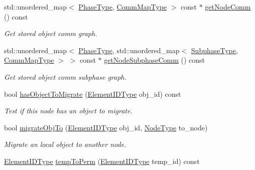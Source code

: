 \begin{DoxyCompactItemize}
std\+::unordered\+\_\+map$<$ \hyperlink{namespacevt_a46ce6733d5cdbd735d561b7b4029f6d7}{Phase\+Type}, \hyperlink{namespacevt_1_1vrt_1_1collection_1_1balance_a10860c956804d644db54a16012352728}{Comm\+Map\+Type} $>$ const  $\ast$ \hyperlink{structvt_1_1vrt_1_1collection_1_1balance_1_1_node_stats_a236c9f6b9ba7446a35cbc1052949d558}{get\+Node\+Comm} () const
\begin{DoxyCompactList}\small\item\em Get stored object comm graph. \end{DoxyCompactList}\item 
std\+::unordered\+\_\+map$<$ \hyperlink{namespacevt_a46ce6733d5cdbd735d561b7b4029f6d7}{Phase\+Type}, std\+::unordered\+\_\+map$<$ \hyperlink{namespacevt_ae78cbfdf1e57470e33eedb074f2beeba}{Subphase\+Type}, \hyperlink{namespacevt_1_1vrt_1_1collection_1_1balance_a10860c956804d644db54a16012352728}{Comm\+Map\+Type} $>$ $>$ const  $\ast$ \hyperlink{structvt_1_1vrt_1_1collection_1_1balance_1_1_node_stats_ae44b616cad5c50a36faeb2cc78457a52}{get\+Node\+Subphase\+Comm} () const
\begin{DoxyCompactList}\small\item\em Get stored object comm subphase graph. \end{DoxyCompactList}\item 
bool \hyperlink{structvt_1_1vrt_1_1collection_1_1balance_1_1_node_stats_a06128ad9d9dff72bad160b015054b054}{has\+Object\+To\+Migrate} (\hyperlink{namespacevt_1_1vrt_1_1collection_1_1balance_a14c8d2c972f2913aa3f1636e5be0a120}{Element\+I\+D\+Type} obj\+\_\+id) const
\begin{DoxyCompactList}\small\item\em Test if this node has an object to migrate. \end{DoxyCompactList}\item 
bool \hyperlink{structvt_1_1vrt_1_1collection_1_1balance_1_1_node_stats_a4beddbda7ae149a3470eba3a2fe80db5}{migrate\+Obj\+To} (\hyperlink{namespacevt_1_1vrt_1_1collection_1_1balance_a14c8d2c972f2913aa3f1636e5be0a120}{Element\+I\+D\+Type} obj\+\_\+id, \hyperlink{namespacevt_a866da9d0efc19c0a1ce79e9e492f47e2}{Node\+Type} to\+\_\+node)
\begin{DoxyCompactList}\small\item\em Migrate an local object to another node. \end{DoxyCompactList}\item 
\hyperlink{namespacevt_1_1vrt_1_1collection_1_1balance_a14c8d2c972f2913aa3f1636e5be0a120}{Element\+I\+D\+Type} \hyperlink{structvt_1_1vrt_1_1collection_1_1balance_1_1_node_stats_a259d49b9aa4759b9d94be3e093fa2e6b}{temp\+To\+Perm} (\hyperlink{namespacevt_1_1vrt_1_1collection_1_1balance_a14c8d2c972f2913aa3f1636e5be0a120}{Element\+I\+D\+Type} temp\+\_\+id) const

\end{DoxyCompactItemize}
